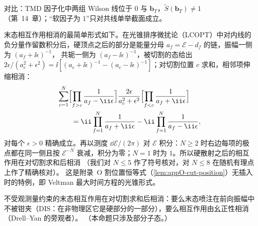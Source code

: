 对比：TMD 因子化中两组 Wilson 线位于 $0$ 与 $\mathbf b_T$，$\tilde S(\mathbf b_T)\ne1$（第~14~章）；“软因子为 $1$”只对共线单举截面成立。

末态相互作用相消的最简单形式如下。在光锥排序微扰论（LCOPT）中对内线的负分量作留数积分后，硬顶点之后的部分是能量分母 $a_f=\mathcal E-d_f$ 的链，振幅一侧为 $(a_f+\ii\epsilon)^{-1}$，
共轭一侧为 $(a_f-\ii\epsilon)^{-1}$，被切割的态给出 $2\epsilon/(a_c^2+\epsilon^2)=\ii[(a_c+\ii\epsilon)^{-1}-(a_c-\ii\epsilon)^{-1}]$；对切割位置 $c$ 求和，相邻项伸缩相消：
\begin{equation}\label{eq:method-cutsum}
\begin{aligned}
&\sum_{c=1}^{N}\Bigl[\prod_{f>c}\frac{1}{a_f-\ii\epsilon}\Bigr]\frac{2\epsilon}{a_c^2+\epsilon^2}\Bigl[\prod_{f<c}\frac{1}{a_f+\ii\epsilon}\Bigr]\\
&\qquad=\ii\prod_{f=1}^{N}\frac{1}{a_f+\ii\epsilon}-\ii\prod_{f=1}^{N}\frac{1}{a_f-\ii\epsilon} ,
\end{aligned}
\end{equation}
对每个 $\epsilon>0$ 精确成立。再以测度 $\dd\mathcal E/(2\pi)$ 对 $\mathcal E$ 积分：$N\ge2$ 时右边每项的极点都在同一侧且按 $\mathcal E^{-N}$ 衰减，积分为零；$N=1$ 时为 $1$。所以硬散射之后的相互作用在对切割求和后相消
（我们对 $N\le5$ 作了符号核对，对 $N\le8$ 在随机有理点上作了精确核对）。%
这是附录~O 割位置恒等式（\cref{lem:appO-cut-position}）无插入时的特例，即 Veltman 最大时间方程的光锥形式。

\begin{proposition}\label{prop:method-fsi}
不受观测量约束的末态相互作用在对切割求和后相消：要么末态喷注在前向振幅中不被钳夹（DIS：在非物理区它是硬部分的一部分），要么相互作用由幺正性相消（Drell--Yan 的旁观者）。
（本命题只涉及部分子态。）
\end{proposition}

